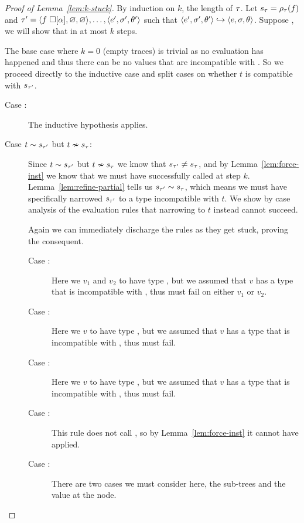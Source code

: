 \begin{proof}[Proof of Lemma~\ref{lem:k-stuck}]
  By induction on $k$, the length of $\tau$. Let $s_{\tau} = \rho_{\tau}(f)$ and
  $\tau' = \langle f\ \square[\alpha], \varnothing, \varnothing \rangle,\ldots,\langle e', \sigma', \theta' \rangle$
  such that $\langle e', \sigma', \theta' \rangle \hookrightarrow \langle e, \sigma, \theta \rangle$.
  Suppose , we
  will show that 
  in at most $k$ steps.

  The base case where $k = 0$ (\ie empty traces) is trivial as no
  evaluation has happened and thus there can be no values that are
  incompatible with . So we proceed directly to the
  inductive case and split cases on whether $t$ is compatible with
  $s_{\tau'}$.
  \begin{description}
  \item [Case :]
    The inductive hypothesis applies.
  \item [Case $t \sim s_{\tau'}$ but $t \nsim s_{\tau}$:]
    Since $t \sim s_{\tau'}$ but $t \nsim s_{\tau}$ we know
    that $s_{\tau'} \neq s_{\tau}$, and
    by Lemma~\ref{lem:force-inst} we know that we must have
    successfully called \forcesym at step $k$.
    Lemma~\ref{lem:refine-partial} tells us
    $s_{\tau'} \sim s_{\tau}$, which means we must have
    specifically narrowed $s_{\tau'}$ to a type incompatible with $t$.
    We show by case analysis of the evaluation rules that narrowing to
    $t$ instead cannot succeed.

    Again we can immediately discharge the 
    rules as they get stuck, proving the consequent.
    \begin{description}
    \item[Case \replusgood:] Here we \forcesym $v_1$ and $v_2$ to have type
      \tint, but we assumed that $v$ has a type that is incompatible with
      \tint, thus \forcesym must fail on either $v_1$ or $v_2$.
    \item[Case :] Here we \forcesym $v$ to have type
      \tbool, but we assumed that $v$ has a type that is incompatible with
      \tbool, thus \forcesym must fail.
    \item[Case \reappgood:] Here we \forcesym $v$ to have type
      \tfun, but we assumed that $v$ has a type that is incompatible with
      \tfun, thus \forcesym must fail.
    \item[Case \releafgood:] This rule does not call \forcesym, so by
      Lemma~\ref{lem:force-inst} it cannot have applied.
    \item[Case \renodegood:] There are two cases we must consider here,
      the sub-trees and the value at the node.


\end{description}
\end{description}
\end{proof}

